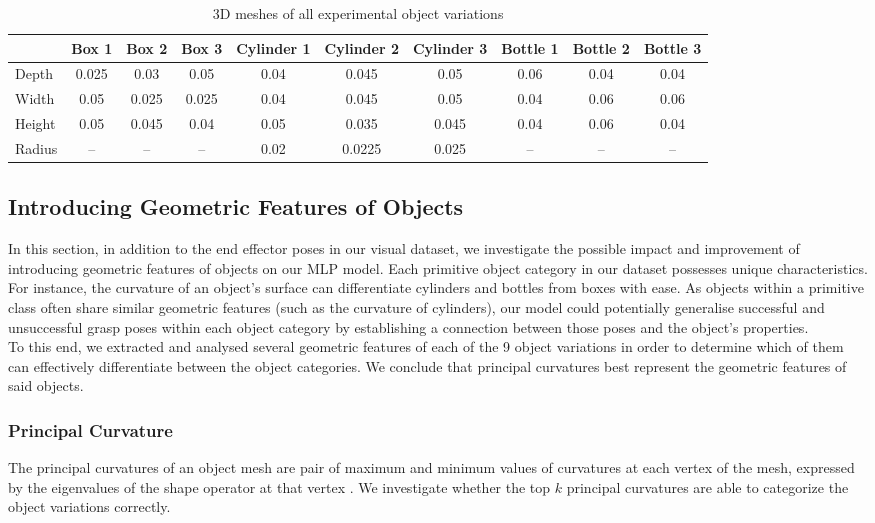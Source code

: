 \documentclass[11pt, a4paper]{report}
\begin{document}
\begin{table}[H]
{\begin{tabular}{lccccccccc}
            & Box 1 & Box 2 & Box 3 & Cylinder 1 & Cylinder 2 & Cylinder 3 & Bottle 1 & Bottle 2 & Bottle 3 \\
            \midrule
            Depth  & 0.025 & 0.03  & 0.05  & 0.04 & 0.045  & 0.05  & 0.06 & 0.04 & 0.04 \\
            Width  & 0.05  & 0.025 & 0.025 & 0.04 & 0.045  & 0.05  & 0.04 & 0.06 & 0.06 \\
            Height & 0.05  & 0.045 & 0.04  & 0.05 & 0.035  & 0.045 & 0.04 & 0.06 & 0.04 \\
            Radius & --    & --    & --    & 0.02 & 0.0225 & 0.025 & --   & --   & --   \\
            \bottomrule
        \end{tabular}
    }
    \caption{3D meshes of all experimental object variations}
    \label{tbl:5.1}
\end{table}


\subsection{Introducing Geometric Features of Objects}\label{sec:5.2.3}
In this section, in addition to the end effector poses in our visual dataset, we investigate the possible impact and improvement of introducing geometric features of objects on our MLP model. Each primitive object category in our dataset possesses unique characteristics. For instance, the curvature of an object's surface can differentiate cylinders and bottles from boxes with ease. As objects within a primitive class often share similar geometric features (such as the curvature of cylinders), our model could potentially generalise successful and unsuccessful grasp poses within each object category by establishing a connection between those poses and the object's properties.\\

To this end, we extracted and analysed several geometric features of each of the 9 object variations in order to determine which of them can effectively differentiate between the object categories. We conclude that principal curvatures best represent the geometric features of said objects.


\subsubsection{Principal Curvature}\label{sec:5.2.3.1}
The principal curvatures of an object mesh are pair of maximum and minimum values of curvatures at each vertex of the mesh, expressed by the eigenvalues of the shape operator at that vertex \cite{enwiki:1141654906}. We investigate whether the top $k$ principal curvatures are able to categorize the object variations correctly.
\end{document}
